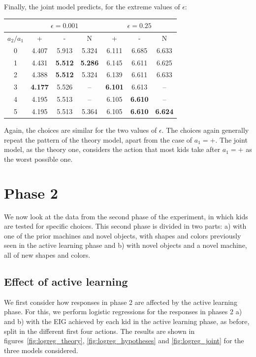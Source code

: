 \documentclass[11pt, a4paper]{article}
\begin{document}
Finally, the joint model predicts, for the extreme values of $\epsilon$:
\begin{center}
\begin{tabular}{|c||c|c|c||c|c|c|}
\hline
 & \multicolumn{3}{|c||}{$\epsilon=0.001$} & \multicolumn{3}{|c|}{$\epsilon=0.25$}\\
 \hline
$a_2 / a_1$ & + & - & N  &+ & - & N\\
\hline\hline
0 & 4.407 & 5.913 & 5.324 & 6.111 & 6.685 & 6.633 \\ 
1 & 4.431 & {\bf 5.512} & {\bf 5.286} & 6.145 & 6.611 & 6.625 \\ 
2 & 4.388 & {\bf 5.512} & 5.324 & 6.139 & 6.611 & 6.633 \\ 
3 & {\bf 4.177} & 5.526 & -- & {\bf 6.101}  & 6.613 & -- \\ 
4 & 4.195 & 5.513 & -- & 6.105 & {\bf 6.610} & -- \\ 
5 & 4.195 & 5.513 & 5.364 & 6.105 & {\bf 6.610}& {\bf 6.624} \\ 
\hline
\end{tabular}
\end{center}
Again, the choices are similar for the two values of $\epsilon$. The choices again generally repeat the pattern of the theory model, apart from the case of $a_1=+$. The joint model, as the theory one, considers the action that most kids take after $a_1=+$ as the worst possible one.




\section*{Phase 2}
We now look at the data from the second phase of the experiment, in which kids are tested for specific choices. This second phase is divided in two parts: a) with one of the prior machines and novel objects, with shapes and colors previously seen in the active learning phase and b) with novel objects and a novel machine, all of new shapes and colors.  

\subsection*{Effect of active learning}
We first consider how responses in phase 2 are affected by the active learning phase. For this, we perform logistic regressions for the responses in phases 2 a) and b) with the EIG achieved by each kid in the active learning phase, as before, split in the different first four actions. The results are shown in figures~\ref{fig:logreg_theory}, \ref{fig:logreg_hypotheses} and \ref{fig:logreg_joint} for the three models considered.
\end{document}
